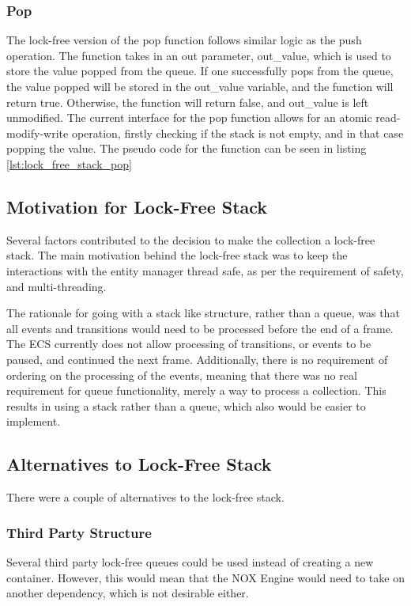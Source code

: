 \subsubsection{Pop}
The lock-free version of the pop function follows similar logic as the push operation.
The function takes in an out parameter, out\_value, which is used to store the value popped from the queue.
If one successfully pops from the queue, the value popped will be stored in the out\_value variable,
and the function will return true. Otherwise, the function will return false, and out\_value is left
unmodified.
The current interface for the pop function allows for an atomic read-modify-write operation, firstly checking if the stack is not empty, and in that case popping the value.
The pseudo code for the function can be seen in listing \ref{lst:lock_free_stack_pop}


\subsection{Motivation for Lock-Free Stack}
Several factors contributed to the decision to make the collection a lock-free stack.
The main motivation behind the lock-free stack was to keep the interactions with the entity manager thread safe, as per the requirement of safety, and multi-threading.

The rationale for going with a stack like structure, rather than a queue, was that all events and transitions would need to be processed before the end of a frame.
The ECS currently does not allow processing of transitions, or events to be paused, and continued the next frame.
Additionally, there is no requirement of ordering on the processing of the events, meaning that there was no real requirement for queue functionality, merely a way to process a collection.
This results in using a stack rather than a queue, which also would be easier to implement.

\subsection{Alternatives to Lock-Free Stack}
There were a couple of alternatives to the lock-free stack.

\subsubsection{Third Party Structure}
Several third party lock-free queues could be used instead of creating a new container. However, this would mean that the NOX Engine would need to take on another dependency, which is not desirable either.

